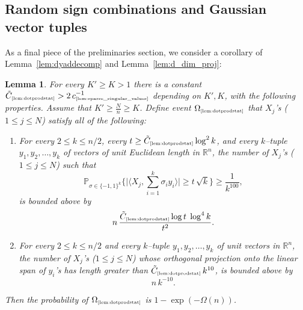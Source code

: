 \documentclass[11pt]{amsart}
\newtheorem{lemma}[theorem]{Lemma}
\theoremstyle{definition}
\theoremstyle{plain}
\newcommand{\R}{\mathbb{R}}
\def\Prob{{\mathbb P}}
\def\R{{\mathbb R}}
\def\Prob{{\mathbb P}}
\begin{document}
\subsection{Random sign combinations and Gaussian vector tuples}
As a final piece of the preliminaries section,
we consider a corollary of Lemma~\ref{lem:dyaddecomp} and Lemma~\ref{lem:d_dim_proj}:
\begin{lemma}\label{lem:dotprodstat}
For every $K'\geq K>1$ there is a constant
$\tilde C_{\text{\tiny\ref{lem:dotprodstat}}}>
2\,c_{\text{\tiny\ref{lem:sparse_singular_values}}}^{-1}$
depending on $K',K$,
with the following properties. Assume that $K'\geq \frac{N}{n}\geq K$.
Define event $\Omega_{\text{\tiny\ref{lem:dotprodstat}}}$
that $X_j$'s ($1\leq j\leq N$) satisfy all of the following:
\begin{enumerate}
\item 
For every $2\leq k\leq n/2$, every $t\geq
\tilde C_{\text{\tiny\ref{lem:dotprodstat}}}
\log^{2} k$,
and every $k$--tuple $y_1,y_2,\dots,y_k$ of vectors of unit Euclidean length in $\R^n$,
the number of $X_j$'s ($1\leq j\leq N$) such that
$$
\Prob_{\sigma\in\{-1,1\}^k}
\Big\{
\big|\big\langle X_j,\sum_{i=1}^k \sigma_i y_i\big\rangle\big|
\geq t\,\sqrt{k}
\Big\}\geq \frac{1}{k^{100}},
$$
is bounded above by
$$
n\,\frac{\tilde C_{\text{\tiny\ref{lem:dotprodstat}}}\log t\;
\log^{4} k }{t^2}.
$$
\item For every $2\leq k\leq n/2$
and every $k$--tuple $y_1,y_2,\dots,y_k$ of unit vectors in $\R^n$,
the number of $X_j$'s ($1\leq j\leq N$)
whose orthogonal projection onto the linear span of $y_i$'s
has length greater than $\tilde C_{\text{\tiny\ref{lem:dotprodstat}}}\,k^{10}$,
is bounded above by 
$$
n\,k^{-10}.
$$
\end{enumerate}
Then the probability of $\Omega_{\text{\tiny\ref{lem:dotprodstat}}}$
is $1-\exp(-\Omega(n))$.
\end{lemma}
\end{document}
